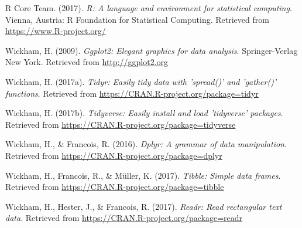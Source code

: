 \documentclass[english,man]{apa6}
\theoremstyle{definition}
\theoremstyle{definition}
\theoremstyle{remark}
\begin{document}
\hypertarget{ref-R-base}{}
R Core Team. (2017). \emph{R: A language and environment for statistical
computing}. Vienna, Austria: R Foundation for Statistical Computing.
Retrieved from \url{https://www.R-project.org/}

\hypertarget{ref-R-ggplot2}{}
Wickham, H. (2009). \emph{Ggplot2: Elegant graphics for data analysis}.
Springer-Verlag New York. Retrieved from \url{http://ggplot2.org}

\hypertarget{ref-R-tidyr}{}
Wickham, H. (2017a). \emph{Tidyr: Easily tidy data with 'spread()' and
'gather()' functions}. Retrieved from
\url{https://CRAN.R-project.org/package=tidyr}

\hypertarget{ref-R-tidyverse}{}
Wickham, H. (2017b). \emph{Tidyverse: Easily install and load
'tidyverse' packages}. Retrieved from
\url{https://CRAN.R-project.org/package=tidyverse}

\hypertarget{ref-R-dplyr}{}
Wickham, H., \& Francois, R. (2016). \emph{Dplyr: A grammar of data
manipulation}. Retrieved from
\url{https://CRAN.R-project.org/package=dplyr}

\hypertarget{ref-R-tibble}{}
Wickham, H., Francois, R., \& Müller, K. (2017). \emph{Tibble: Simple
data frames}. Retrieved from
\url{https://CRAN.R-project.org/package=tibble}

\hypertarget{ref-R-readr}{}
Wickham, H., Hester, J., \& Francois, R. (2017). \emph{Readr: Read
rectangular text data}. Retrieved from
\url{https://CRAN.R-project.org/package=readr}
\end{document}
